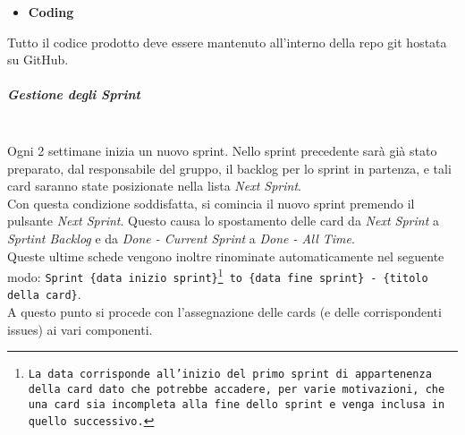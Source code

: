 \begin{itemize}
    \item \textbf{Coding}
\end{itemize}
Tutto il codice prodotto deve essere mantenuto all'interno della repo git hostata su GitHub.

\subparagraph{Gestione degli Sprint}
\mbox{}\\
Ogni 2 settimane inizia un nuovo sprint. Nello sprint precedente sarà già stato preparato, dal responsabile del gruppo, il backlog per lo sprint in partenza, e tali card saranno state posizionate nella lista \textit{Next Sprint}. \\
Con questa condizione soddisfatta, si comincia il nuovo sprint premendo il pulsante \textit{Next Sprint}. Questo causa lo spostamento delle card da \textit{Next Sprint} a \textit{Sprtint Backlog} e da \textit{Done - Current Sprint} a \textit{Done - All Time}.\\
Queste ultime schede vengono inoltre rinominate automaticamente nel seguente modo: \texttt{Sprint \{data inizio sprint\}\footnote{La data corrisponde all'inizio del primo sprint di appartenenza della card dato che potrebbe accadere, per varie motivazioni, che una card sia incompleta alla fine dello sprint e venga inclusa in quello successivo.} to \{data fine sprint\} - \{titolo della card\}}.\\
A questo punto si procede con l'assegnazione delle cards (e delle corrispondenti issues) ai vari componenti.


